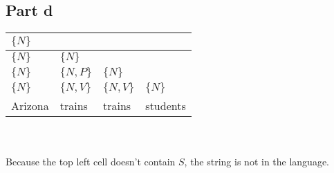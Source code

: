 \documentclass{article}%
\begin{document}
\subsection*{Part d}

\begin{tabular}{| l | l | l | l |}
    \hline
    $\{N\}$ & & & \\
    \hline
    $\{N\}$ & $\{N\}$ & & \\
    \hline
    $\{N\}$ & $\{N, P\}$ & $\{N\}$ & \\
    \hline
    $\{N\}$ & $\{N, V\}$ & $\{N, V\}$ & $\{N\}$ \\
    \hline
    Arizona & trains & trains & students \\
    \hline
\end{tabular}\\
\\
Because the top left cell doesn't contain $S$, the string is not in the language.
\end{document}
